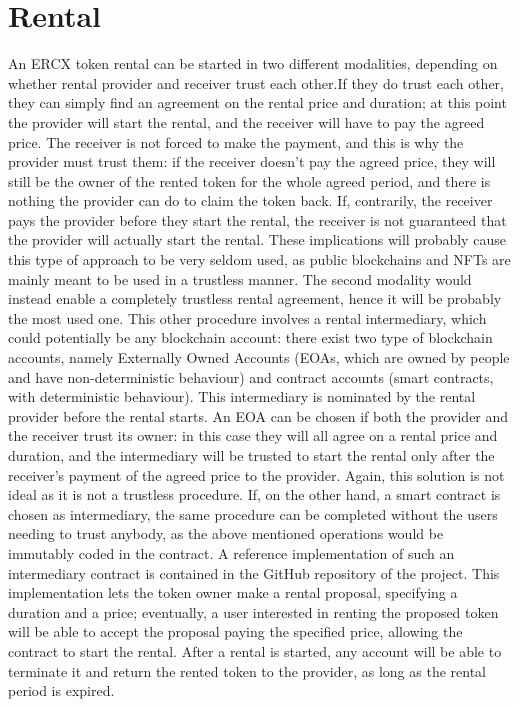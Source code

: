 \documentclass[english, LaM, oneside]{sapthesis}%
\begin{document}
\section{Rental}
An ERCX token rental can be started in two different modalities, depending on whether rental provider and receiver trust each other.\newline If they do trust each other, they can simply find an agreement on the rental price and duration; at this point the provider will start the rental, and the receiver will have to pay the agreed price. The receiver is not forced to make the payment, and this is why the provider must trust them: if the receiver doesn't pay the agreed price, they will still be the owner of the rented token for the whole agreed period, and there is nothing the provider can do to claim the token back. If, contrarily, the receiver pays the provider before they start the rental, the receiver is not guaranteed that the provider will actually start the rental. These implications will probably cause this type of approach to be very seldom used, as public blockchains and NFTs are mainly meant to be used in a trustless manner.\newline
The second modality would instead enable a completely trustless rental agreement, hence it will be probably the most used one. This other procedure involves a rental intermediary, which could potentially be any blockchain account: there exist two type of blockchain accounts, namely Externally Owned Accounts (EOAs, which are owned by people and have non-deterministic behaviour) and contract accounts (smart contracts, with deterministic behaviour). This intermediary is nominated by the rental provider before the rental starts. An EOA can be chosen if both the provider and the receiver trust its owner: in this case they will all agree on a rental price and duration, and the intermediary will be trusted to start the rental only after the receiver's payment of the agreed price to the provider. Again, this solution is not ideal as it is not a trustless procedure. If, on the other hand, a smart contract is chosen as intermediary, the same procedure can be completed without the users needing to trust anybody, as the above mentioned operations would be immutably coded in the contract. A reference implementation of such an intermediary contract is contained in the GitHub repository of the project. This implementation lets the token owner make a rental proposal, specifying a duration and a price; eventually, a user interested in renting the proposed token will be able to accept the proposal paying the specified price, allowing the contract to start the rental. After a rental is started, any account will be able to terminate it and return the rented token to the provider, as long as the rental period is expired. \newline
\end{document}

